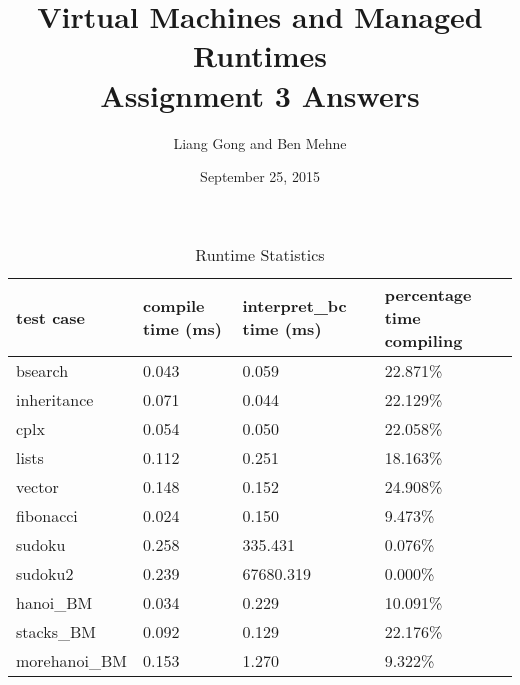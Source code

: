 \documentclass[notitlepage]{report}
\title{\vspace{-0.5in}Virtual Machines and Managed Runtimes \\ Assignment 3 Answers}
\date{\vspace{-0.5in}September 25, 2015}
\author{\vspace{-0.5in}Liang Gong and Ben Mehne\vspace{-0.5in}}
\begin{document}
\maketitle

\begin{table}[!htp]
\centering
\caption{Runtime Statistics}
\label{statistics}
{\footnotesize
\begin{tabular}{llll}
\toprule
test case & compile time (ms)    & interpret\_bc time (ms) & percentage time compiling \\
\midrule
bsearch        & 0.043          & 0.059          & 22.871\%     \\
inheritance    & 0.071          & 0.044          & 22.129\%     \\
cplx           & 0.054          & 0.050          & 22.058\%     \\
lists          & 0.112          & 0.251          & 18.163\%     \\
vector         & 0.148          & 0.152          & 24.908\%     \\
fibonacci      & 0.024          & 0.150          & 9.473\%      \\
sudoku         & 0.258          & 335.431        & 0.076\%      \\
sudoku2        & 0.239          & 67680.319      & 0.000\%      \\
hanoi\_BM      & 0.034          & 0.229          & 10.091\%     \\
stacks\_BM     & 0.092          & 0.129          & 22.176\%     \\
morehanoi\_BM  & 0.153          & 1.270          & 9.322\%      \\
\bottomrule
\end{tabular}
}
\end{table}
\end{document}
